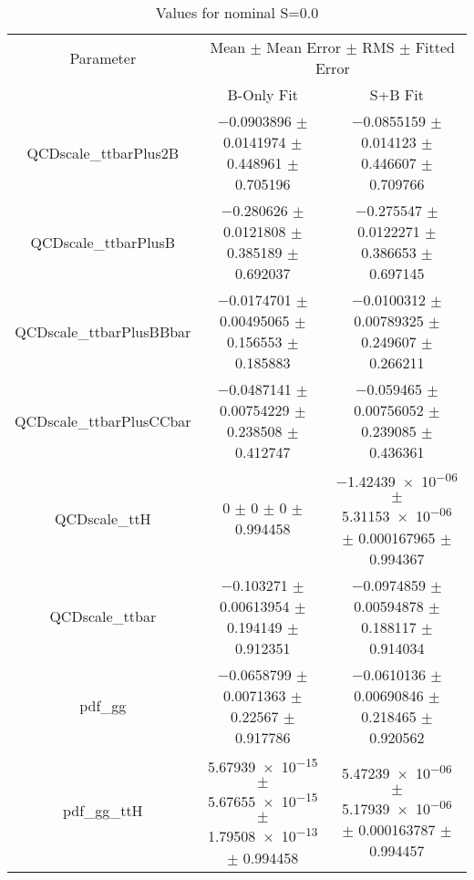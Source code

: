 \begin{table}
\centering
\caption{Values for nominal S=0.0}
\begin{tabular}{ccc}
\toprule
Parameter & \multicolumn{2}{c}{Mean $\pm$ Mean Error $\pm$ RMS $\pm$ Fitted Error}\\
 & B-Only Fit & S+B Fit\\
\midrule
QCDscale\_ttbarPlus2B & \num{-0.0903896} $\pm$ \num{0.0141974} $\pm$ \num{0.448961} $\pm$ \num{0.705196} & \num{-0.0855159} $\pm$ \num{0.014123} $\pm$ \num{0.446607} $\pm$ \num{0.709766}\\
QCDscale\_ttbarPlusB & \num{-0.280626} $\pm$ \num{0.0121808} $\pm$ \num{0.385189} $\pm$ \num{0.692037} & \num{-0.275547} $\pm$ \num{0.0122271} $\pm$ \num{0.386653} $\pm$ \num{0.697145}\\
QCDscale\_ttbarPlusBBbar & \num{-0.0174701} $\pm$ \num{0.00495065} $\pm$ \num{0.156553} $\pm$ \num{0.185883} & \num{-0.0100312} $\pm$ \num{0.00789325} $\pm$ \num{0.249607} $\pm$ \num{0.266211}\\
QCDscale\_ttbarPlusCCbar & \num{-0.0487141} $\pm$ \num{0.00754229} $\pm$ \num{0.238508} $\pm$ \num{0.412747} & \num{-0.059465} $\pm$ \num{0.00756052} $\pm$ \num{0.239085} $\pm$ \num{0.436361}\\
QCDscale\_ttH & \num{0} $\pm$ \num{0} $\pm$ \num{0} $\pm$ \num{0.994458} & \num{-1.42439e-06} $\pm$ \num{5.31153e-06} $\pm$ \num{0.000167965} $\pm$ \num{0.994367}\\
QCDscale\_ttbar & \num{-0.103271} $\pm$ \num{0.00613954} $\pm$ \num{0.194149} $\pm$ \num{0.912351} & \num{-0.0974859} $\pm$ \num{0.00594878} $\pm$ \num{0.188117} $\pm$ \num{0.914034}\\
pdf\_gg & \num{-0.0658799} $\pm$ \num{0.0071363} $\pm$ \num{0.22567} $\pm$ \num{0.917786} & \num{-0.0610136} $\pm$ \num{0.00690846} $\pm$ \num{0.218465} $\pm$ \num{0.920562}\\
pdf\_gg\_ttH & \num{5.67939e-15} $\pm$ \num{5.67655e-15} $\pm$ \num{1.79508e-13} $\pm$ \num{0.994458} & \num{5.47239e-06} $\pm$ \num{5.17939e-06} $\pm$ \num{0.000163787} $\pm$ \num{0.994457}\\
\bottomrule
\end{tabular}
\end{table}